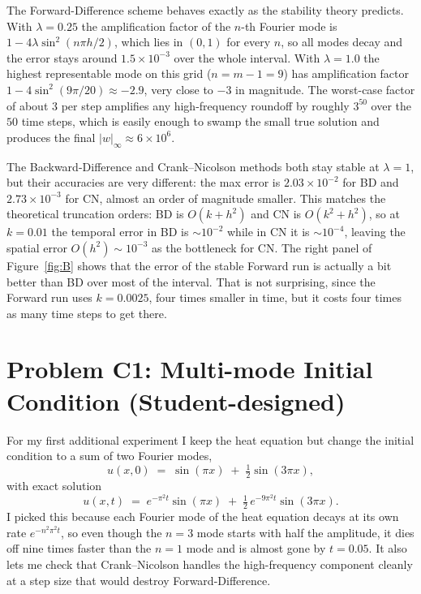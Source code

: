 \documentclass[11pt]{article}
\begin{document}
The Forward-Difference scheme behaves exactly as the stability theory
predicts. With $\lambda = 0.25$ the amplification factor of the $n$-th
Fourier mode is $1 - 4\lambda\sin^{2}(n\pi h/2)$, which lies in $(0, 1)$ for
every $n$, so all modes decay and the error stays around $1.5 \times 10^{-3}$
over the whole interval. With $\lambda = 1.0$ the highest representable mode
on this grid ($n = m - 1 = 9$) has amplification factor
$1 - 4\sin^{2}(9\pi/20) \approx -2.9$, very close to $-3$ in magnitude. The
worst-case factor of about $3$ per step amplifies any high-frequency
roundoff by roughly $3^{50}$ over the $50$ time steps, which is easily
enough to swamp the small true solution and produces the final
$|w|_{\infty} \approx 6 \times 10^{6}$.

The Backward-Difference and Crank--Nicolson methods both stay stable at
$\lambda = 1$, but their accuracies are very different: the max error is
$2.03 \times 10^{-2}$ for BD and $2.73 \times 10^{-3}$ for CN, almost an
order of magnitude smaller. This matches the theoretical truncation orders:
BD is $O(k + h^{2})$ and CN is $O(k^{2} + h^{2})$, so at $k = 0.01$ the
temporal error in BD is $\sim 10^{-2}$ while in CN it is $\sim 10^{-4}$,
leaving the spatial error $O(h^{2}) \sim 10^{-3}$ as the bottleneck for CN.
The right panel of Figure~\ref{fig:B} shows that the error of the stable
Forward run is actually a bit better than BD over most of the interval.
That is not surprising, since the Forward run uses $k = 0.0025$, four times
smaller in time, but it costs four times as many time steps to get there.

\section{Problem C1: Multi-mode Initial Condition (Student-designed)}
For my first additional experiment I keep the heat equation but change the
initial condition to a sum of two Fourier modes,
\[
u(x, 0) \;=\; \sin(\pi x) \;+\; \tfrac{1}{2}\sin(3\pi x),
\]
with exact solution
\[
u(x, t) \;=\; e^{-\pi^{2} t}\sin(\pi x) \;+\;
\tfrac{1}{2}\,e^{-9\pi^{2} t}\sin(3\pi x).
\]
I picked this because each Fourier mode of the heat equation decays at its
own rate $e^{-n^{2}\pi^{2}t}$, so even though the $n = 3$ mode starts with
half the amplitude, it dies off nine times faster than the $n = 1$ mode and
is almost gone by $t = 0.05$. It also lets me check that Crank--Nicolson
handles the high-frequency component cleanly at a step size that would
destroy Forward-Difference.
\end{document}
